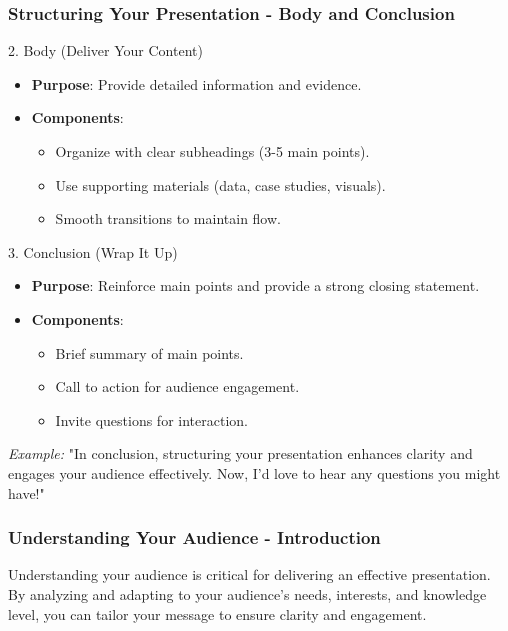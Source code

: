 \documentclass{beamer}
\begin{document}
\begin{frame}[fragile]
    \frametitle{Structuring Your Presentation - Body and Conclusion}
    \begin{block}{2. Body (Deliver Your Content)}
        \begin{itemize}
            \item \textbf{Purpose}: Provide detailed information and evidence.
            \item \textbf{Components}:
            \begin{itemize}
                \item Organize with clear subheadings (3-5 main points).
                \item Use supporting materials (data, case studies, visuals).
                \item Smooth transitions to maintain flow.
            \end{itemize}
        \end{itemize}
    \end{block}
    
    \begin{block}{3. Conclusion (Wrap It Up)}
        \begin{itemize}
            \item \textbf{Purpose}: Reinforce main points and provide a strong closing statement.
            \item \textbf{Components}:
            \begin{itemize}
                \item Brief summary of main points.
                \item Call to action for audience engagement.
                \item Invite questions for interaction.
            \end{itemize}
        \end{itemize}
    \end{block}
    \textit{Example:} "In conclusion, structuring your presentation enhances clarity and engages your audience effectively. Now, I’d love to hear any questions you might have!"
\end{frame}

\begin{frame}[fragile]
    \frametitle{Understanding Your Audience - Introduction}
    Understanding your audience is critical for delivering an effective presentation. By analyzing and adapting to your audience’s needs, interests, and knowledge level, you can tailor your message to ensure clarity and engagement.
\end{frame}
\end{document}
